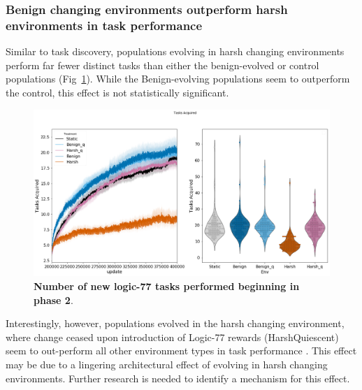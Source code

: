 \documentclass[PhD]{msu-thesis}
\begin{document}
 

\subsubsection{Benign changing environments outperform harsh environments in task performance}
Similar to task discovery, populations evolving in harsh changing environments perform far fewer distinct tasks than either the benign-evolved or control populations (Fig~\ref{fig:lte-task_performance}). While the Benign-evolving populations seem to outperform the control, this effect is not statistically significant. 

	\begin{figure}[!h]
	\includegraphics[trim={0 0 0 0}, clip, width=0.75\columnwidth]{figures/LTE/lte-simple-post_reward_task_performance.png}
	\caption{\textbf{Number of new logic-77 tasks performed beginning in phase 2}.%
	}
	\label{fig:lte-task_performance}
	\end{figure}  

Interestingly, however, populations evolved in the harsh changing environment, where change ceased upon introduction of Logic-77 rewards (HarshQuiescent) seem to out-perform all other environment types in task performance . This effect may be due to a lingering architectural effect of evolving in harsh changing environments. Further research is needed to identify a mechanism for this effect.
\end{document}
